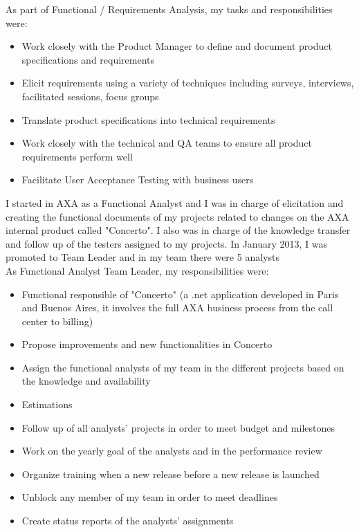\documentclass[11pt,a4paper,sans]{moderncv}
\begin{document}
As part of  Functional / Requirements Analysis, my tasks and responsibilities were:
\begin{itemize}
  \item Work closely with the Product Manager to define and document product specifications and requirements
  \item Elicit requirements using a variety of techniques including surveys, interviews, facilitated sessions, focus groups
  \item Translate product specifications into technical requirements
  \item Work closely with the technical and QA teams to ensure all product requirements perform well
  \item Facilitate User Acceptance Testing with business users
\newline
\newline
\end{itemize}




I started in AXA as a Functional Analyst and I was in charge of elicitation and creating the functional documents of my projects related to changes on the AXA internal product called "Concerto". I also was in charge of the knowledge transfer and follow up of the testers assigned to my projects. In January 2013, I was promoted to Team Leader and in my team there were 5 analysts
\\

As Functional Analyst Team Leader, my responsibilities were:
\begin{itemize}
  \item Functional responsible of "Concerto" (a .net application developed in Paris and Buenos Aires, it involves the full AXA business process from the call center to billing)
  \item Propose improvements and new functionalities in Concerto
  \item Assign the functional analysts of my team in the different projects based on the knowledge and availability
  \item Estimations
  \item Follow up of all analysts' projects in order to meet budget and milestones
  \item Work on the yearly goal of the analysts and in the performance review
  \item Organize training when a new release before a new release is launched
  \item Unblock any member of my team in order to meet deadlines
  \item Create status reports of the analysts' assignments
\newline{}
\newline
\end{itemize}
\end{document}
